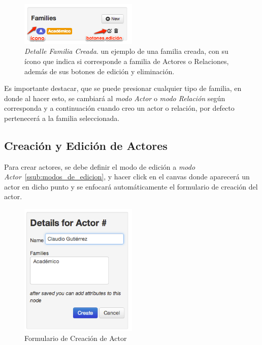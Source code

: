 \begin{figure}[H]
  \centering
  \includegraphics[width=0.5\textwidth]{images/familia_creada.png}
  \caption[Detalle Familia Creada]{\emph{Detalle Familia Creada}. un ejemplo de una familia creada, con su ícono que indica si corresponde a familia de Actores o Relaciones, además de sus botones de edición y eliminación.}
  \label{familia_creada}
\end{figure}

Es importante destacar, que se puede presionar cualquier tipo de familia, en donde al hacer esto, se cambiará al \emph{modo Actor} o \emph{modo Relación} según corresponda y a continuación cuando creo un actor o relación, por defecto pertenecerá a la familia seleccionada.


\subsection{Creación y Edición de Actores} %
\label{sub:creacion_y_edicion_de_actores}

Para crear actores, se debe definir el modo de edición a \emph{modo Actor}~\ref{ssub:modos_de_edicion}, y hacer click en el canvas donde aparecerá un actor en dicho punto y se enfocará automáticamente el formulario de creación del actor.\\

\begin{figure}[H]
  \centering
  \includegraphics[width=0.5\textwidth]{images/creacion_actor.png}
  \caption{Formulario de Creación de Actor}
  \label{creacion_actor}
\end{figure}

